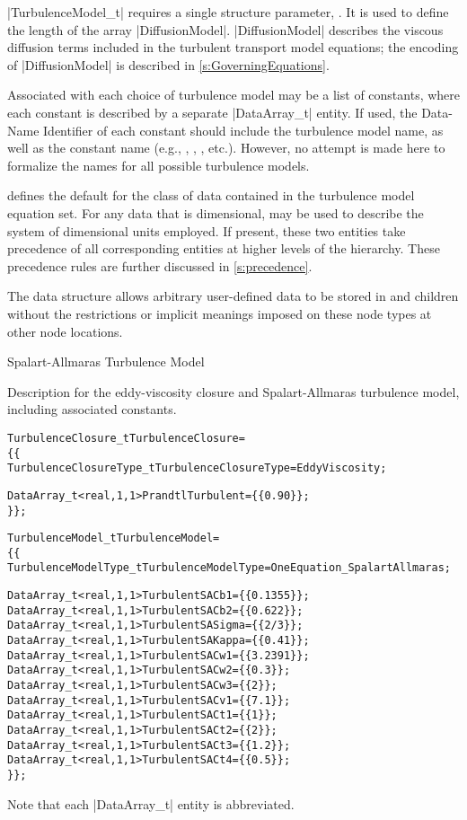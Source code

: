 |TurbulenceModel_t| requires a single structure parameter,
.
It is used to define the length of the array |DiffusionModel|.
|DiffusionModel| describes the viscous diffusion terms included in the
turbulent transport model equations; the encoding of |DiffusionModel| is
described in \autoref{s:GoverningEquations}.

Associated with each choice of turbulence model may be a list of constants,
where each constant is described by a separate |DataArray_t| entity.
If used, the Data-Name Identifier of each constant should include the
turbulence model name, as well as the constant name (e.g.,
, , ,
etc.).
However, no attempt is made here to formalize the names for all possible
turbulence models.

 defines the default for the class of data contained in the
turbulence model equation set.
For any data that is dimensional,  may be used to
describe the system of dimensional units employed.
If present, these two entities take precedence of all corresponding
entities at higher levels of the hierarchy.
These precedence rules are further discussed in \autoref{s:precedence}.

The  data structure allows arbitrary
user-defined data to be stored in  and
 children without the restrictions or implicit
meanings imposed on these node types at other node locations.

\begin{example}{Spalart-Allmaras Turbulence Model}

Description for the eddy-viscosity closure and Spalart-Allmaras
turbulence model, including associated constants.
\begin{alltt}
  TurbulenceClosure\_t TurbulenceClosure =
    \{\{
    TurbulenceClosureType\_t TurbulenceClosureType = EddyViscosity ;

    DataArray\_t<real, 1, 1> PrandtlTurbulent = \{\{ 0.90 \}\} ;
    \}\} ;

  TurbulenceModel\_t TurbulenceModel = 
    \{\{
    TurbulenceModelType\_t TurbulenceModelType = OneEquation\_SpalartAllmaras ;

    DataArray\_t<real, 1, 1> TurbulentSACb1   = \{\{ 0.1355 \}\} ;
    DataArray\_t<real, 1, 1> TurbulentSACb2   = \{\{ 0.622 \}\} ;
    DataArray\_t<real, 1, 1> TurbulentSASigma = \{\{ 2/3 \}\} ;
    DataArray\_t<real, 1, 1> TurbulentSAKappa = \{\{ 0.41 \}\} ;
    DataArray\_t<real, 1, 1> TurbulentSACw1   = \{\{ 3.2391 \}\} ;
    DataArray\_t<real, 1, 1> TurbulentSACw2   = \{\{ 0.3 \}\} ;
    DataArray\_t<real, 1, 1> TurbulentSACw3   = \{\{ 2 \}\} ;
    DataArray\_t<real, 1, 1> TurbulentSACv1   = \{\{ 7.1 \}\} ;
    DataArray\_t<real, 1, 1> TurbulentSACt1   = \{\{ 1 \}\} ;
    DataArray\_t<real, 1, 1> TurbulentSACt2   = \{\{ 2 \}\} ;
    DataArray\_t<real, 1, 1> TurbulentSACt3   = \{\{ 1.2 \}\} ;
    DataArray\_t<real, 1, 1> TurbulentSACt4   = \{\{ 0.5 \}\} ;
    \}\} ;
\end{alltt}
Note that each |DataArray_t| entity is abbreviated.
\end{example}

